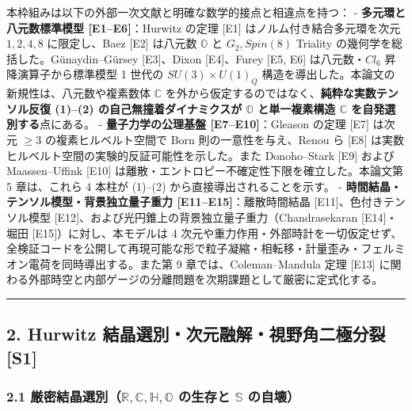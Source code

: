 \documentclass[
  a4paper,
]{ltjsarticle}
\begin{document}
本枠組みは以下の外部一次文献と明確な数学的接点と相違点を持つ： -
\textbf{多元環と八元数標準模型 {[}E1--E6{]}}：Hurwitz の定理 {[}E1{]}
はノルム付き結合多元環を次元 \(1, 2, 4, 8\) に限定し、Baez {[}E2{]}
は八元数 \(\mathbb{O}\) と \(G_2, Spin(8)\) Triality
の幾何学を総括した。Günaydin--Gürsey {[}E3{]}、Dixon {[}E4{]}、Furey
{[}E5, E6{]} は八元数・\(Cl_6\) 昇降演算子から標準模型 1 世代の
\(SU(3) \times U(1)_Q\)
構造を導出した。本論文の新規性は、八元数や複素数体 \(\mathbb{C}\)
を外から仮定するのではなく、\textbf{純粋な実数テンソル反復 (1)--(2)
の自己無撞着ダイナミクスが \(\mathbb{O}\) と単一複素構造 \(\mathbb{C}\)
を自発選別する}点にある。 - \textbf{量子力学の公理基盤
{[}E7--E10{]}}：Gleason の定理 {[}E7{]} は次元 \(\ge 3\)
の複素ヒルベルト空間で Born 則の一意性を与え、Renou ら {[}E8{]}
は実数ヒルベルト空間の実験的反証可能性を示した。また Donoho--Stark
{[}E9{]} および Maassen--Uffink {[}E10{]}
は離散・エントロピー不確定性下限を確立した。本論文第 5 章は、これら 4
本柱が (1)--(2) から直接導出されることを示す。 -
\textbf{時間結晶・テンソル模型・背景独立量子重力
{[}E11--E15{]}}：離散時間結晶 {[}E11{]}、色付きテンソル模型
{[}E12{]}、および光円錐上の背景独立量子重力（Chandrasekaran
{[}E14{]}・堀田 {[}E15{]}）に対し、本モデルは 4
次元や重力作用・外部時計を一切仮定せず、全検証コードを公開して再現可能な形で粒子凝縮・相転移・計量歪み・フェルミオン電荷を同時導出する。また第
9 章では、Coleman--Mandula 定理 {[}E13{]}
に関わる外部時空と内部ゲージの分離問題を次期課題として厳密に定式化する。

\begin{center}\rule{0.5\linewidth}{0.5pt}\end{center}

\subsection{2. Hurwitz 結晶選別・次元融解・視野角二極分裂
{[}S1{]}}\label{hurwitz-ux7d50ux6676ux9078ux5225ux6b21ux5143ux878dux89e3ux8996ux91ceux89d2ux4e8cux6975ux5206ux88c2-s1}

\subsubsection{\texorpdfstring{2.1
厳密結晶選別（\(\mathbb{R}, \mathbb{C}, \mathbb{H}, \mathbb{O}\)
の生存と \(\mathbb{S}\)
の自壊）}{2.1 厳密結晶選別（\textbackslash mathbb\{R\}, \textbackslash mathbb\{C\}, \textbackslash mathbb\{H\}, \textbackslash mathbb\{O\} の生存と \textbackslash mathbb\{S\} の自壊）}}\label{ux53b3ux5bc6ux7d50ux6676ux9078ux5225mathbbr-mathbbc-mathbbh-mathbbo-ux306eux751fux5b58ux3068-mathbbs-ux306eux81eaux58ca}
\end{document}
